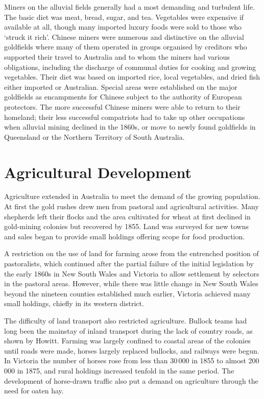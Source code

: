 Miners on the alluvial fields generally had a most demanding and
turbulent life.  The basic diet was meat, bread, sugar, and tea.
Vegetables were expensive if available at all, though many imported
luxury foods were sold to those who `struck it rich'.
Chinese miners were numerous and distinctive on the
alluvial goldfields where many of them operated in groups organised by
creditors who supported their travel to Australia and to whom the
miners had various obligations, including the discharge of communal
duties for cooking and growing vegetables.  Their diet was based on
imported rice, local vegetables, and dried fish either imported or
Australian.  Special areas were established on the major goldfields as
encampments for Chinese subject to the authority of
European protectors.  The more successful Chinese
miners were able to return to their homeland; their less successful
compatriots had to take up other occupations when alluvial mining
declined in the 1860s, or move to newly found goldfields in Queensland
or the Northern Territory of South
Australia.

\section*{Agricultural Development}

Agriculture extended in Australia to meet the demand of the growing
population.  At first the gold rushes drew men from
pastoral and agricultural activities.  Many shepherds left their
flocks and the area cultivated for wheat at first
declined in gold-mining colonies but recovered by 1855.  Land was
surveyed for new towns and sales began to provide small holdings
offering scope for food production.

A restriction on the use of land for farming arose from the entrenched
position of pastoralists,  which continued after
the partial failure of the initial legislation by the early 1860s in
New South Wales and Victoria to allow settlement by selectors in the
pastoral areas.  However, while there was little change in New South
Wales beyond the nineteen counties established much earlier, Victoria
achieved many small holdings, chiefly in its western
district.

The difficulty of land transport also restricted agriculture.  Bullock
teams had long been the mainstay of inland transport during the lack
of country roads, as shown by Howitt.  Farming was largely confined to
coastal areas of the colonies until roads were made,
horses largely replaced bullocks, and
railways were begun.  In Victoria
 the number of horses  rose from less
than 30\,000 in 1855 to almost 200\,000 in 1875, and rural holdings
increased tenfold in the same period.  The development of horse-drawn
traffic also put a demand on agriculture through the need for oaten
hay.

